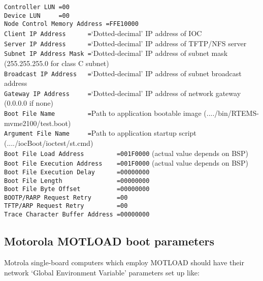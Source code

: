 \noindent
\verb|Controller LUN =00|\\
\verb|Device LUN     =00|\\
\verb|Node Control Memory Address =FFE10000|\\
\verb|Client IP Address      =|`Dotted-decimal' IP address of IOC\\
\verb|Server IP Address      =|`Dotted-decimal' IP address of TFTP/NFS server\\
\verb|Subnet IP Address Mask =|`Dotted-decimal' IP address of subnet mask (255.255.255.0 for class C subnet)\\
\verb|Broadcast IP Address   =|`Dotted-decimal' IP address of subnet broadcast address\\
\verb|Gateway IP Address     =|`Dotted-decimal' IP address of network gateway (0.0.0.0 if none)\\
\verb|Boot File Name         =|Path to application bootable image (..../bin/RTEMS-mvme2100/test.boot)\\
\verb|Argument File Name     =|Path to application startup script (..../iocBoot/ioctest/st.cmd)\\
\verb|Boot File Load Address         =001F0000| (actual value depends on BSP)\\
\verb|Boot File Execution Address    =001F0000| (actual value depends on BSP)\\
\verb|Boot File Execution Delay      =00000000|\\
\verb|Boot File Length               =00000000|\\
\verb|Boot File Byte Offset          =00000000|\\
\verb|BOOTP/RARP Request Retry       =00      |\\
\verb|TFTP/ARP Request Retry         =00      |\\
\verb|Trace Character Buffer Address =00000000|

\subsection{Motorola MOTLOAD boot parameters}

Motrola single-board computers which employ MOTLOAD should have their network `Global Environment Variable' parameters set up like:

